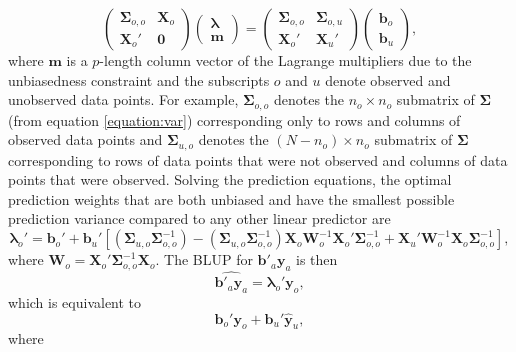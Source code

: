 \documentclass[]{article}    %
\begin{document}
\begin{equation}
\begin{pmatrix}
\bm{\Sigma}_{o, o} & \mathbf{X}_o \\
\mathbf{X}_o' & \mathbf{0}
\end{pmatrix} 
\begin{pmatrix}
\bm{\lambda} \\
\mathbf{m}
\end{pmatrix} = 
\begin{pmatrix}
\bm{\Sigma}_{o, o} & \bm{\Sigma}_{o, u} \\
\mathbf{X}_{o}' & \mathbf{X}_{u}'
\end{pmatrix} 
\begin{pmatrix}
\mathbf{b}_{o} \\
\mathbf{b}_{u}
\end{pmatrix},
\end{equation} \noindent where \(\mathbf{m}\) is a \(p\)-length column
vector of the Lagrange multipliers due to the unbiasedness constraint
and the subscripts \(o\) and \(u\) denote observed and unobserved data
points. For example, \(\bm{\Sigma}_{o, o}\) denotes the
\(n_o \times n_o\) submatrix of \(\bm{\Sigma}\) (from equation
\ref{equation:var}) corresponding only to rows and columns of observed
data points and \(\bm{\Sigma}_{u, o}\) denotes the
\((N - n_o) \times n_o\) submatrix of \(\bm{\Sigma}\) corresponding to
rows of data points that were not observed and columns of data points
that were observed. Solving the prediction equations, the optimal
prediction weights that are both unbiased and have the smallest possible
prediction variance compared to any other linear predictor are \mbox{}
\begin{equation}
\bm{\lambda}_o' = \mathbf{b}_{o}' + \mathbf{b}_{u}'\left[ (\bm{\Sigma}_{u, o}\bm{\Sigma}_{o, o}^{-1}) - (\bm{\Sigma}_{u, o} \bm{\Sigma}_{o, o}^{-1})\mathbf{X}_o\mathbf{W}_o^{-1}\mathbf{X}_o'\bm{\Sigma}_{o, o}^{-1} + \mathbf{X}_{u}'\mathbf{W}_o^{-1}\mathbf{X}_o \bm{\Sigma}_{o, o}^{-1} \right],
\end{equation} \noindent where
\(\mathbf{W}_o = \mathbf{X}_o'\bm{\Sigma}_{o, o}^{-1}\mathbf{X}_o\). The
BLUP for \(\mathbf{b}'_a \mathbf{y}_a\) is then \mbox{}
\begin{equation} \label{equation:blup}
\widehat{\mathbf{b}'_a \mathbf{y}_a} = \bm{\lambda}_o' \mathbf{y}_o,
\end{equation} \noindent which is equivalent to \mbox{}
\begin{equation*}
\mathbf{b}_{o}'\mathbf{y}_{o} + \mathbf{b}_{u}' \mathbf{\hat{y}}_{u},
\end{equation*} \noindent where
\end{document}
